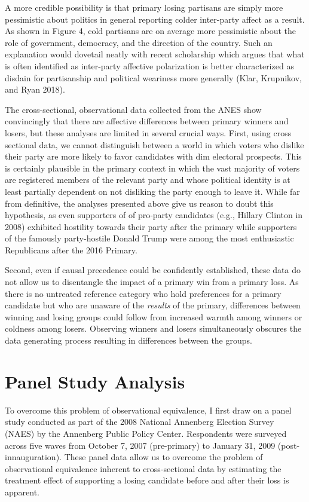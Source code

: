 \documentclass[
]{article}
\begin{document}
A more credible possibility is that primary losing partisans are simply more pessimistic about politics in general reporting colder inter-party affect as a result. As shown in Figure 4, cold partisans are on average more pessimistic about the role of government, democracy, and the direction of the country. Such an explanation would dovetail neatly with recent scholarship which argues that what is often identified as inter-party affective polarization is better characterized as disdain for partisanship and political weariness more generally (Klar, Krupnikov, and Ryan 2018).

The cross-sectional, observational data collected from the ANES show convincingly that there are affective differences between primary winners and losers, but these analyses are limited in several crucial ways. First, using cross sectional data, we cannot distinguish between a world in which voters who dislike their party are more likely to favor candidates with dim electoral prospects. This is certainly plausible in the primary context in which the vast majority of voters are registered members of the relevant party and whose political identity is at least partially dependent on not disliking the party enough to leave it. While far from definitive, the analyses presented above give us reason to doubt this hypothesis, as even supporters of of pro-party candidates (e.g., Hillary Clinton in 2008) exhibited hostility towards their party after the primary while supporters of the famously party-hostile Donald Trump were among the most enthusiastic Republicans after the 2016 Primary.

Second, even if causal precedence could be confidently established, these data do not allow us to disentangle the impact of a primary win from a primary loss. As there is no untreated reference category who hold preferences for a primary candidate but who are unaware of the \emph{results} of the primary, differences between winning and losing groups could follow from increased warmth among winners or coldness among losers. Observing winners and losers simultaneously obscures the data generating process resulting in differences between the groups.

\hypertarget{panel-study-analysis}{%
\section{Panel Study Analysis}\label{panel-study-analysis}}

To overcome this problem of observational equivalence, I first draw on a panel study conducted as part of the 2008 National Annenberg Election Survey (NAES) by the Annenberg Public Policy Center. Respondents were surveyed across five waves from October 7, 2007 (pre-primary) to January 31, 2009 (post-innauguration). These panel data allow us to overcome the problem of observational equivalence inherent to cross-sectional data by estimating the treatment effect of supporting a losing candidate before and after their loss is apparent.
\end{document}
